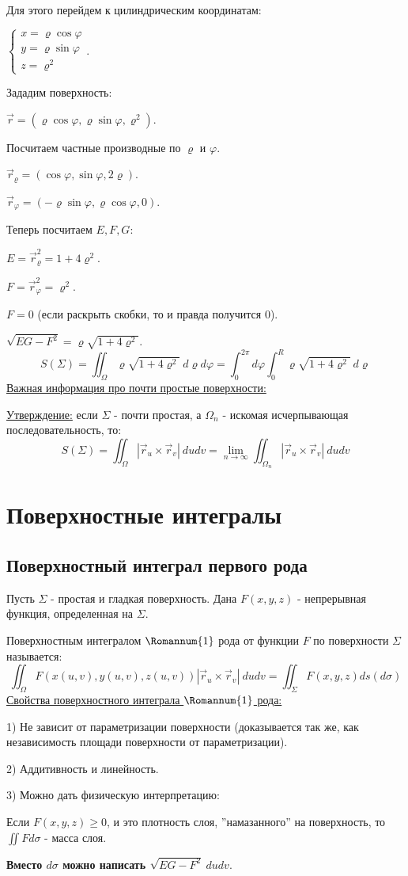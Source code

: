 \documentclass[12pt]{article}
\begin{document}
Для этого перейдем к цилиндрическим координатам:\par
$\begin{cases} x=\varrho \cos \varphi \\ y = \varrho \sin \varphi \\ z = \varrho^2 \end{cases}$.\par
Зададим поверхность:\par
$\overrightarrow{r} = (\varrho\cos\varphi, \varrho\sin\varphi, \varrho^2)$.\par
Посчитаем частные производные по $\varrho$ и $\varphi$.\par
$\overrightarrow{r}_\varrho = (\cos\varphi, \sin\varphi, 2\varrho)$.\par
$\overrightarrow{r}_\varphi = (-\varrho\sin\varphi, \varrho\cos\varphi, 0)$.\par
Теперь посчитаем $E, F, G$:\par
$E = \overrightarrow{r}_\varrho^2 = 1 + 4 \varrho^2$.\par\par
$F = \overrightarrow{r}_\varphi^2 = \varrho^2$.\par
$F = 0$ (если раскрыть скобки, то и правда получится 0).\par
$\sqrt{EG-F^2} = \varrho\sqrt{1+4\varrho^2}$.
$$S(\Sigma)=\iint_\Omega \varrho\sqrt{1+4\varrho^2} \ d\varrho d\varphi = \int_0^{2\pi} d\varphi \int_0^R \varrho\sqrt{1+4\varrho^2} \ d\varrho$$
\uline{Важная информация про почти простые поверхности:}\par
\uline{Утверждение:} если $\Sigma$ - почти простая, а $\Omega_n$ - искомая исчерпывающая последовательность, то:
$$S(\Sigma) = \iint_\Omega |\overrightarrow{r}_u \times \overrightarrow{r}_v| \ dudv = \lim_{n\to\infty} \iint_{\Omega_n} |\overrightarrow{r}_u \times \overrightarrow{r}_v| \ dudv$$
\section{Поверхностные интегралы}
\subsection{Поверхностный интеграл первого рода}
Пусть $\Sigma$ - простая и гладкая поверхность. Дана $F(x,y,z)$ - непрерывная функция, определенная на $\Sigma$.\par
Поверхностным интегралом $\Romannum{1}$ рода от функции $F$ по поверхности $\Sigma$ называется:
$$\iint_\Omega F(x(u,v),y(u,v),z(u,v)) | \overrightarrow{r}_u \times \overrightarrow{r}_v| \ dudv = \iint_\Sigma F(x,y,z) ds (d\sigma)$$
\uline{Свойства поверхностного интеграла $\Romannum{1}$ рода:}\par
1) Не зависит от параметризации поверхности (доказывается так же, как независимость площади поверхности от параметризации).\par
2) Аддитивность и линейность.\par
3) Можно дать физическую интерпретацию:\par
Если $F(x,y,z) \geq 0$, и это плотность слоя, ''намазанного'' на поверхность, то $\iint F d\sigma$ - масса слоя.\par
\textbf{Вместо $d\sigma$ можно написать $\sqrt{EG-F^2} \ dudv$}.\par
\end{document}
